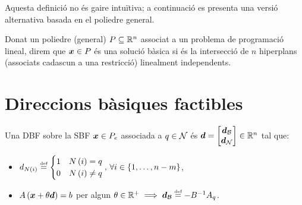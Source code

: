 Aquesta definició no és gaire intuïtiva; a continuació es presenta una versió alternativa basada en el poliedre general.

\begin{defi}\label{defi:SB-alt}
	Donat un poliedre (general) $P\subseteq\mathbb{R}^n$ associat a un problema de 
	programació lineal, direm que $\boldsymbol{x}\in P$ és una solució bàsica si és la 
	intersecció de $n$ hiperplans (associats cadascun a una restricció) 
	linealment independents.
\end{defi}

\section{Direccions bàsiques factibles}
\begin{defi}
    Una DBF sobre la SBF $\boldsymbol{x} \in P_e$ associada a $q \in \mathcal{N}$ és $\boldsymbol{d} =
    \begin{bmatrix}
        \boldsymbol{d}_{\mathcal{B}} \\
        \boldsymbol{d}_{\mathcal{N}}
    \end{bmatrix}
    \in \mathbb{R}^n$ tal que:
    \begin{itemize}
        \item $d_{N\left(i\right)} \stackrel{\text{\tiny def}}{=}
            \begin{cases}
                1 & N\left(i\right) = q \\
                0 & N\left(i\right) \neq q
            \end{cases}
            ,\, \forall i \in \left\{1, \dots, n-m \right\}$,
        \item $A \left(\boldsymbol{x} + \theta \boldsymbol{d}\right) = b$ per algun $\theta \in \mathbb{R}^+ \implies \boldsymbol{d}_{\mathcal{B}} \stackrel{\text{\tiny def}}{=} -B^{-1} A_q$.
    \end{itemize}
\end{defi}

